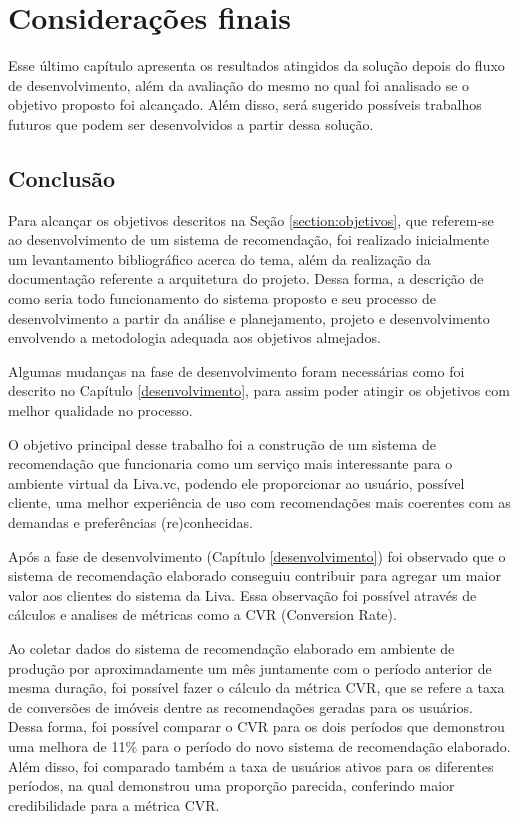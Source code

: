 \chapter{Considerações finais}

Esse último capítulo apresenta os resultados atingidos da solução depois do fluxo de desenvolvimento, além da avaliação do mesmo no qual foi analisado se o objetivo proposto foi alcançado. Além disso, será sugerido possíveis trabalhos futuros que podem ser desenvolvidos a partir dessa solução.

\section{Conclusão}

Para alcançar os objetivos descritos na Seção \ref{section:objetivos}, que referem-se ao desenvolvimento de um sistema de recomendação, foi realizado inicialmente um levantamento bibliográfico acerca do tema, além da realização da documentação referente a arquitetura do projeto. Dessa forma, a descrição de como seria todo funcionamento do sistema proposto e seu processo de desenvolvimento a partir da análise e planejamento, projeto e desenvolvimento envolvendo a metodologia adequada aos objetivos almejados.

Algumas mudanças na fase de desenvolvimento foram necessárias como foi descrito no Capítulo \ref{desenvolvimento}, para assim poder atingir os objetivos com melhor qualidade no processo.

O objetivo principal desse trabalho foi a construção de um sistema de recomendação que funcionaria como um serviço mais interessante para o ambiente virtual da Liva.vc, podendo ele proporcionar ao usuário, possível cliente, uma melhor experiência de uso com recomendações mais coerentes com as demandas e preferências (re)conhecidas.

Após a fase de desenvolvimento (Capítulo \ref{desenvolvimento}) foi observado que o sistema de recomendação elaborado conseguiu contribuir para agregar um maior valor aos clientes do sistema da Liva. Essa observação foi possível através de cálculos e analises de métricas como a CVR (Conversion Rate).

Ao coletar dados do sistema de recomendação elaborado em ambiente de produção por aproximadamente um mês juntamente com o período anterior de mesma duração, foi possível fazer o cálculo da métrica CVR, que se refere a taxa de conversões de imóveis dentre as recomendações geradas para os usuários. Dessa forma, foi possível comparar o CVR para os dois períodos que demonstrou uma melhora de 11\% para o período do novo sistema de recomendação elaborado. Além disso, foi comparado também a taxa de usuários ativos para os diferentes períodos, na qual demonstrou uma proporção parecida, conferindo maior credibilidade para a métrica CVR.

